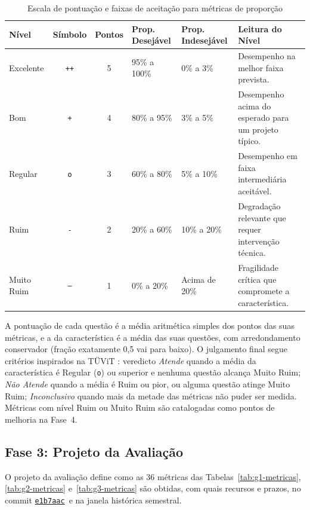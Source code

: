 \documentclass[12pt]{article}
\newcommand{\commitref}{\href{https://github.com/excalidraw/excalidraw/commit/e1b7aacb356a492aa1e0fc6eb57b8896124027f0}{\texttt{e1b7aac}}}
\begin{document}
\begin{table}[!ht]
\centering
\caption{Escala de pontuação e faixas de aceitação para métricas de proporção}
\label{tab:escala_pontuacao}
\vspace{2pt}
\footnotesize
\begin{tabular}{lccllp{3.3cm}}
\toprule
\textbf{Nível} & \textbf{Símbolo} & \textbf{Pontos} & \textbf{Prop. Desejável} & \textbf{Prop. Indesejável} & \textbf{Leitura do Nível} \\
\midrule
Excelente  & \texttt{++} & 5 & 95\% a 100\% & 0\% a 3\%   & Desempenho na melhor faixa prevista. \\
Bom        & \texttt{+}  & 4 & 80\% a 95\%  & 3\% a 5\%   & Desempenho acima do esperado para um projeto típico. \\
Regular    & \texttt{o}  & 3 & 60\% a 80\%  & 5\% a 10\%  & Desempenho em faixa intermediária aceitável. \\
Ruim       & \texttt{-}  & 2 & 20\% a 60\%  & 10\% a 20\% & Degradação relevante que requer intervenção técnica. \\
Muito Ruim & \texttt{--} & 1 & 0\% a 20\%   & Acima de 20\% & Fragilidade crítica que compromete a característica. \\
\bottomrule
\end{tabular}
\end{table}

A pontuação de cada questão é a média aritmética simples dos pontos das suas métricas, e a da característica é a média das suas questões, com arredondamento conservador (fração exatamente 0,5 vai para baixo). O julgamento final segue critérios inspirados na TÜViT \cite{baggen2010}: veredicto \textit{Atende} quando a média da característica é Regular (\texttt{o}) ou superior e nenhuma questão alcança Muito Ruim; \textit{Não Atende} quando a média é Ruim ou pior, ou alguma questão atinge Muito Ruim; \textit{Inconclusivo} quando mais da metade das métricas não puder ser medida. Métricas com nível Ruim ou Muito Ruim são catalogadas como pontos de melhoria na Fase~4.

\subsection{Fase 3: Projeto da Avaliação}
\label{subsec:fase3}

O projeto da avaliação define como as 36 métricas das Tabelas~\ref{tab:g1-metricas}, \ref{tab:g2-metricas} e~\ref{tab:g3-metricas} são obtidas, com quais recursos e prazos, no commit \commitref\ e na janela histórica semestral.
\end{document}
